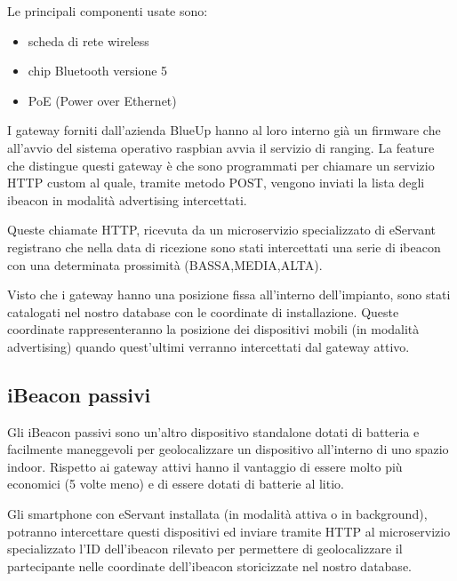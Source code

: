 Le principali componenti usate sono:
\begin{itemize}
    \item scheda di rete wireless
    \item chip Bluetooth versione 5
    \item PoE (Power over Ethernet)
\end{itemize}

I gateway forniti dall'azienda BlueUp hanno al loro interno già un firmware che all'avvio del sistema operativo
raspbian avvia il servizio di ranging.
La feature che distingue questi gateway è che sono programmati per chiamare un servizio HTTP custom 
al quale, tramite metodo POST, vengono inviati la lista degli ibeacon in modalità advertising intercettati.

Queste chiamate HTTP, ricevuta da un microservizio specializzato di eServant registrano che nella data
di ricezione sono stati intercettati una serie di ibeacon con una determinata prossimità (BASSA,MEDIA,ALTA).

Visto che i gateway hanno una posizione fissa all'interno dell'impianto, sono stati catalogati nel nostro
database con le coordinate di installazione.
Queste coordinate rappresenteranno la posizione dei dispositivi mobili (in modalità advertising) quando quest'ultimi
verranno intercettati dal gateway attivo.

\subsection{iBeacon passivi}
Gli iBeacon passivi sono un'altro dispositivo standalone dotati di batteria e facilmente maneggevoli per
geolocalizzare un dispositivo all'interno di uno spazio indoor.
Rispetto ai gateway attivi hanno il vantaggio di essere molto più economici (5 volte meno) e di essere
dotati di batterie al litio.

Gli smartphone con eServant installata (in modalità attiva o in background), potranno intercettare
questi dispositivi ed inviare tramite HTTP al microservizio specializzato l'ID dell'ibeacon rilevato
per permettere di geolocalizzare il partecipante nelle coordinate dell'ibeacon storicizzate nel nostro
database.


